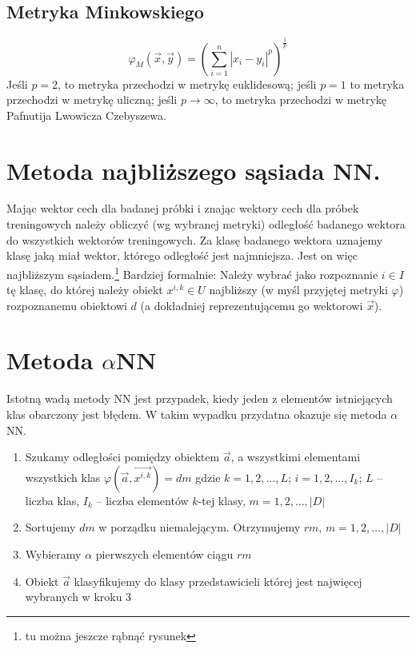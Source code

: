 \documentclass[a4paper,10pt]{article}
\begin{document}
\subsection{Metryka Minkowskiego}
\begin{equation}
  \varphi_M(\overrightarrow{x}, \overrightarrow{y}) = \left({\sum_{i = 1}^n |x_i - y_i|^p}\right)^{\frac{1}{p}}
\end{equation}
Jeśli $p = 2$, to metryka przechodzi w metrykę euklidesową; jeśli $p = 1$ to metryka przechodzi w metrykę uliczną; jeśli $p \rightarrow \infty$, to metryka przechodzi w metrykę Pafnutija Lwowicza Czebyszewa.

\section{Metoda najbliższego sąsiada NN.}
Mając wektor cech dla badanej próbki i znając wektory cech dla próbek treningowych należy obliczyć (wg wybranej metryki) odległość badanego wektora do wszystkich wektorów treningowych. Za klasę badanego wektora uznajemy klasę jaką miał wektor, którego odległość jest najmniejsza. Jest on więc najbliższym sąsiadem.\footnote{tu można jeszcze rąbnąć rysunek}
Bardziej formalnie: Należy wybrać jako rozpoznanie $i \in I$ tę klasę, do której należy obiekt $x^{i,k} \in U$ najbliższy (w myśl przyjętej metryki $\varphi$) rozpoznanemu obiektowi $d$ (a dokładniej reprezentującemu go wektorowi $\overrightarrow{x}$).

\section{Metoda $\alpha$NN}
Istotną wadą metody NN jest przypadek, kiedy jeden z elementów istniejących klas obarczony jest błędem. W takim wypadku przydatna okazuje się metoda $\alpha$NN.
\begin{enumerate}
\item Szukamy odległości pomiędzy obiektem $\overrightarrow{a}$, a wszystkimi elementami wszystkich klas $\varphi(\overrightarrow{a},\overrightarrow{x^{i,k}})=dm$ gdzie $k = 1, 2, \ldots, L$; $i = 1,2, \ldots, I_k$; $L$ – liczba klas, $I_k$ – liczba elementów $k$-tej klasy, $m=1,2,\ldots,|D|$
\item Sortujemy $dm$ w porządku niemalejącym. Otrzymujemy $rm$, $m = 1,2,\ldots, |D|$
\item Wybieramy $\alpha$ pierwszych elementów ciągu $rm$
\item Obiekt $\overrightarrow{a}$ klasyfikujemy do klasy przedstawicieli której jest najwięcej wybranych w kroku 3
\end{enumerate}
\end{document}
